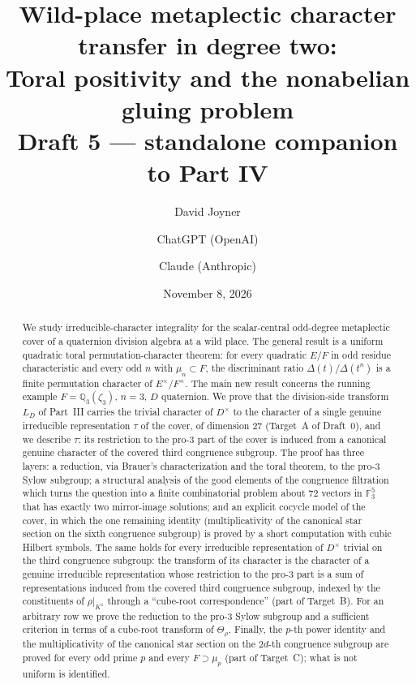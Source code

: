 \documentclass[11pt]{article}
\title{Wild-place metaplectic character transfer in degree two:\\
Toral positivity and the nonabelian gluing problem\\[0.4em]
\normalsize Draft 5 --- standalone companion to Part IV}
\author{David Joyner \and ChatGPT (OpenAI) \and Claude (Anthropic)}
\date{November 8, 2026}
\newcommand{\Q}{\mathbb Q}
\newcommand{\Fq}{\mathbb F}
\theoremstyle{plain}
\theoremstyle{definition}
\begin{document}
\maketitle
\begin{abstract}
We study irreducible-character integrality for the scalar-central
odd-degree metaplectic cover of a quaternion division algebra at a
wild place.  The general result is a uniform quadratic toral
permutation-character theorem: for every quadratic $E/F$ in odd
residue characteristic and every odd $n$ with $\mu_n\subset F$, the
discriminant ratio $\Delta(t)/\Delta(t^n)$ is a finite permutation
character of $E^\times/F^\times$.  The main new result concerns the
running example $F=\Q_3(\zeta_3)$, $n=3$, $D$ quaternion.  We prove
that the division-side transform $L_D$ of Part~III carries the
trivial character of $D^\times$ to the character of a single genuine
irreducible representation $\tau$ of the cover, of dimension $27$
(Target~A of Draft~0), and we describe $\tau$: its restriction to the
pro-$3$ part of the cover is induced from a canonical genuine
character of the covered third congruence subgroup.  The proof has
three layers: a reduction, via Brauer's characterization and the
toral theorem, to the pro-$3$ Sylow subgroup; a structural analysis
of the good elements of the congruence filtration which turns the
question into a finite combinatorial problem about $72$ vectors in
$\Fq_3^5$ that has exactly two mirror-image solutions; and an
explicit cocycle model of the cover, in which the one remaining
identity (multiplicativity of the canonical star section on the sixth
congruence subgroup) is proved by a short computation with cubic
Hilbert symbols.  The same holds for every irreducible representation of $D^\times$
trivial on the third congruence subgroup: the transform of its
character is the character of a genuine irreducible representation
whose restriction to the pro-$3$ part is a sum of representations
induced from the covered third congruence subgroup, indexed by the
constituents of $\rho|_{K^1}$ through a ``cube-root correspondence''
(part of Target~B).  For an arbitrary row
we prove the reduction to the pro-$3$ Sylow subgroup and a sufficient
criterion in terms of a cube-root transform of $\Theta_\rho$.  Finally,
the $p$-th power identity and the multiplicativity of the canonical star
section on the $2d$-th congruence subgroup are proved for every odd prime
$p$ and every $F\supset\mu_p$ (part of Target~C); what is not uniform is
identified.
\end{abstract}
\tableofcontents
\end{document}
